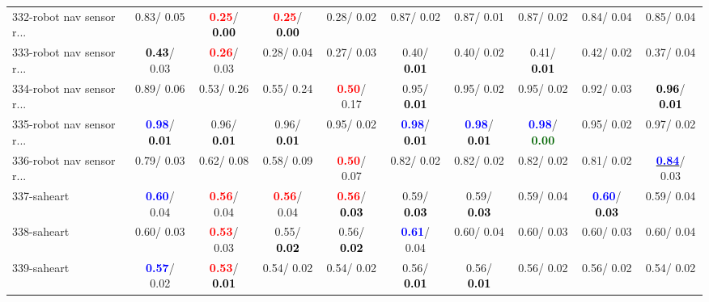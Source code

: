 \begin{table}[h]
\begin{center}
{\begin{tabular}{lc|c|c|c|c|c|c|c|c}
332-robot nav sensor r... &   0.83/  0.05 & \textcolor{red}{\textbf{  0.25}}/\textcolor{black}{\textbf{  0.00}} & \textcolor{red}{\textbf{  0.25}}/\textcolor{black}{\textbf{  0.00}} &   0.28/  0.02 &   0.87/  0.02 &   0.87/  0.01 &   0.87/  0.02 &   0.84/  0.04 &   0.85/  0.04 \\
333-robot nav sensor r... & \textcolor{black}{\textbf{  0.43}}/  0.03 & \textcolor{red}{\textbf{  0.26}}/  0.03 &   0.28/  0.04 &   0.27/  0.03 &   0.40/\textcolor{black}{\textbf{  0.01}} &   0.40/  0.02 &   0.41/\textcolor{black}{\textbf{  0.01}} &   0.42/  0.02 &   0.37/  0.04 \\
334-robot nav sensor r... &   0.89/  0.06 &   0.53/  0.26 &   0.55/  0.24 & \textcolor{red}{\textbf{  0.50}}/  0.17 &   0.95/\textcolor{black}{\textbf{  0.01}} &   0.95/  0.02 &   0.95/  0.02 &   0.92/  0.03 & \textcolor{black}{\textbf{  0.96}}/\textcolor{black}{\textbf{  0.01}} \\ \hline
335-robot nav sensor r... & \textcolor{blue}{\textbf{  0.98}}/\textcolor{black}{\textbf{  0.01}} &   0.96/\textcolor{black}{\textbf{  0.01}} &   0.96/\textcolor{black}{\textbf{  0.01}} &   0.95/  0.02 & \textcolor{blue}{\textbf{  0.98}}/\textcolor{black}{\textbf{  0.01}} & \textcolor{blue}{\textbf{  0.98}}/\textcolor{black}{\textbf{  0.01}} & \textcolor{blue}{\textbf{  0.98}}/\textcolor{darkgreen}{\textbf{  0.00}} &   0.95/  0.02 &   0.97/  0.02 \\
336-robot nav sensor r... &   0.79/  0.03 &   0.62/  0.08 &   0.58/  0.09 & \textcolor{red}{\textbf{  0.50}}/  0.07 &   0.82/  0.02 &   0.82/  0.02 &   0.82/  0.02 &   0.81/  0.02 & \underline{\textcolor{blue}{\textbf{  0.84}}}/  0.03 \\
337-saheart & \textcolor{blue}{\textbf{  0.60}}/  0.04 & \textcolor{red}{\textbf{  0.56}}/  0.04 & \textcolor{red}{\textbf{  0.56}}/  0.04 & \textcolor{red}{\textbf{  0.56}}/\textcolor{black}{\textbf{  0.03}} &   0.59/\textcolor{black}{\textbf{  0.03}} &   0.59/\textcolor{black}{\textbf{  0.03}} &   0.59/  0.04 & \textcolor{blue}{\textbf{  0.60}}/\textcolor{black}{\textbf{  0.03}} &   0.59/  0.04 \\
338-saheart &   0.60/  0.03 & \textcolor{red}{\textbf{  0.53}}/  0.03 &   0.55/\textcolor{black}{\textbf{  0.02}} &   0.56/\textcolor{black}{\textbf{  0.02}} & \textcolor{blue}{\textbf{  0.61}}/  0.04 &   0.60/  0.04 &   0.60/  0.03 &   0.60/  0.03 &   0.60/  0.04 \\
339-saheart & \textcolor{blue}{\textbf{  0.57}}/  0.02 & \textcolor{red}{\textbf{  0.53}}/\textcolor{black}{\textbf{  0.01}} &   0.54/  0.02 &   0.54/  0.02 &   0.56/\textcolor{black}{\textbf{  0.01}} &   0.56/\textcolor{black}{\textbf{  0.01}} &   0.56/  0.02 &   0.56/  0.02 &   0.54/  0.02 \\

\end{tabular}}
\end{center}
\end{table}
